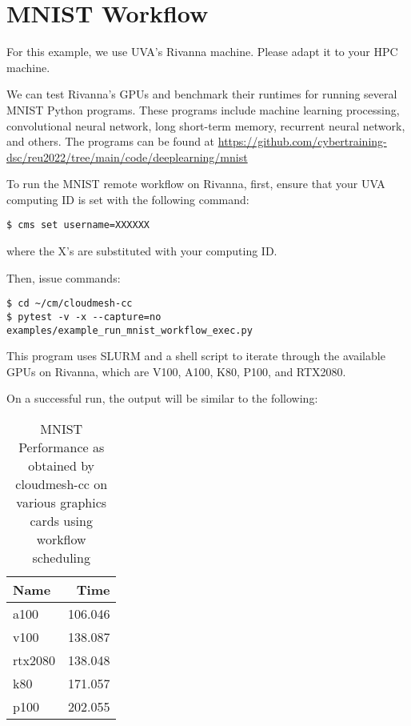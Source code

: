 
\section{MNIST Workflow}\label{mnist-workflow}

For this example, we use UVA's Rivanna machine. Please adapt it to your
HPC machine.

We can test Rivanna's GPUs and benchmark their runtimes for running
several MNIST Python programs. These programs include machine learning
processing, convolutional neural network, long short-term memory,
recurrent neural network, and others. The programs can be found at
\url{https://github.com/cybertraining-dsc/reu2022/tree/main/code/deeplearning/mnist}

To run the MNIST remote workflow on Rivanna, first, ensure that your UVA
computing ID is set with the following command:

\smallskip
\begin{verbatim}
$ cms set username=XXXXXX
\end{verbatim}
\smallskip

where the X's are substituted with your computing ID.

Then, issue commands:

\smallskip
\begin{verbatim}
$ cd ~/cm/cloudmesh-cc
$ pytest -v -x --capture=no examples/example_run_mnist_workflow_exec.py
\end{verbatim}
\smallskip

This program uses SLURM and a shell script to iterate through the
available GPUs on Rivanna, which are V100, A100, K80, P100, and RTX2080.

On a successful run, the output will be similar to the following:

\begin{table}[!ht]
\caption{MNIST Performance as obtained by cloudmesh-cc on various graphics cards using workflow scheduling}
    \centering
    \begin{tabular}{lr}
    \hline
        Name & Time \\ \hline
        a100 & 106.046 \\ 
        v100 & 138.087 \\ 
        rtx2080 & 138.048 \\
        k80 & 171.057 \\ 
        p100 & 202.055 \\
    \end{tabular}
    \label{table:mnist-times}
  \end{table}
  
